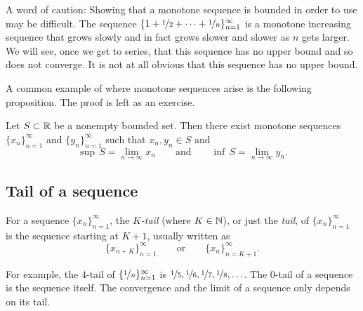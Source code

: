 \begin{example}
A word of caution:  Showing that a monotone sequence is bounded
in order to use  may be difficult.
The sequence
$\{ 1 + \nicefrac{1}{2} + \cdots + \nicefrac{1}{n} \}_{n=1}^\infty$
is a monotone increasing
sequence that grows slowly and in fact grows slower and slower as $n$ gets
larger.  We will see, once we get to series,
that this sequence has no upper bound and so does not converge.  It is not
at all obvious that this sequence has no upper bound.
\end{example}

A common example of where monotone sequences arise is the following
proposition.  The proof is left as an exercise.

\begin{prop} \label{prop:supinfseq}
Let $S \subset {\mathbb{R}}$ be a nonempty bounded set.
Then there exist monotone sequences
$\{ x_n \}_{n=1}^\infty$ and $\{ y_n \}_{n=1}^\infty$ such that $x_n, y_n \in S$ and
\begin{equation*}
\sup\,S = \lim_{n\to \infty} x_n \qquad \text{and} \qquad \inf\,S =
\lim_{n\to\infty} y_n .
\end{equation*}
\end{prop}

\subsection{Tail of a sequence}

\begin{defn}
For a sequence $\{ x_n \}_{n=1}^\infty$,
the \emph{$K$-tail} (where $K \in {\mathbb{N}}$),
or just the
\emph{tail}, of
$\{ x_n \}_{n=1}^\infty$ is the sequence starting at $K+1$, usually written as
\begin{equation*}
\{ x_{n+K} \}_{n=1}^\infty
\qquad \text{or} \qquad \{ x_n \}_{n=K+1}^\infty .
\end{equation*}
\end{defn}

For example, the $4$-tail of $\{ \nicefrac{1}{n} \}_{n=1}^\infty$ is
$\nicefrac{1}{5}, \nicefrac{1}{6}, \nicefrac{1}{7}, \nicefrac{1}{8},
\ldots$.  The $0$-tail of a sequence is the sequence itself.
The convergence and the limit of a sequence only depends on its tail.


